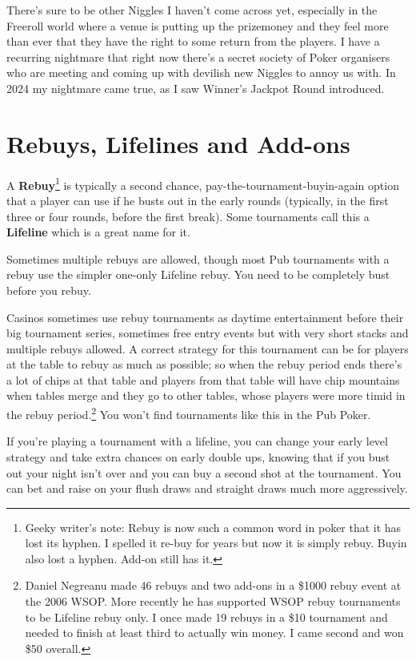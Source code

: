 There's sure to be other Niggles I haven't come across yet,
especially in the Freeroll world where a venue is putting up the
prizemoney and they feel more than ever that they have the right
to some return from the players. I have a recurring
nightmare that right now there's a secret society of Poker organisers
who are meeting and coming up with devilish new Niggles to annoy us with.
In 2024 my nightmare came true, as I saw Winner's Jackpot Round
introduced.

\section{Rebuys, Lifelines and Add-ons}

A \textbf{Rebuy}\footnote{Geeky writer's note: Rebuy is now such a
  common word in poker that it has lost its hyphen. I spelled it
  re-buy for years but now it is simply rebuy. Buyin also lost a
  hyphen. Add-on still has it.}
is typically a second chance, pay-the-tournament-buyin-again
option that a player can use if he busts out in the early rounds
(typically, in the first three or four rounds, before the first
break). Some tournaments call this a \textbf{Lifeline} which is a
great name for it.

Sometimes multiple rebuys are allowed, though most Pub tournaments
with a rebuy use the simpler one-only Lifeline rebuy. You
need to be completely bust before you rebuy.

Casinos sometimes use rebuy tournaments as daytime entertainment
before their big tournament series, sometimes free entry events
but with very short stacks and multiple rebuys allowed. A correct
strategy for this tournament can be for players at the table
to rebuy as much as possible; so when the rebuy period ends there's
a lot of chips at that table and players from that table will
have chip mountains when tables merge and they go to
other tables, whose players were more timid in the rebuy
period.\footnote{Daniel Negreanu made 46 rebuys and two add-ons
  in a \$1000 rebuy event at the 2006 WSOP. More recently he has
  supported WSOP rebuy tournaments to be Lifeline rebuy only. I once
  made 19 rebuys in a \$10 tournament and needed to finish at least
  third to actually win money. I came second and won \$50 overall.} You
won't find tournaments like this in the Pub Poker.

If you're playing a tournament with a lifeline, you can change
your early level strategy and take extra chances on early
double ups, knowing that if you bust out your night isn't over and
you can buy a second shot at the tournament. You can bet and raise
on your flush draws and straight draws much more aggressively.

